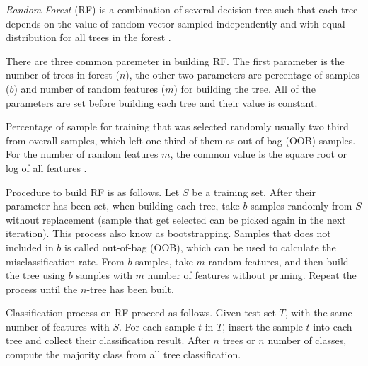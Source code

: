 \textit{Random Forest} (RF)
is a combination of several decision tree such that each tree depends on the
value of random vector sampled independently and with equal distribution for
all trees in the forest
\cite{breiman2001random}.

There are three common paremeter in building RF.
The first parameter is the number of trees in forest ($n$),
the other two parameters are percentage of samples ($b$) and number of random
features ($m$) for building the tree.
All of the parameters are set before building each tree and their value is
constant.

Percentage of sample for training that was selected randomly usually two third
from overall samples, which left one third of them as out of bag (OOB) samples.
For the number of random features $m$, the common value is the square root or
log of all features \cite{breiman2001random}.

Procedure to build RF is as follows.
Let $S$ be a training set.
After their parameter has been set, when building each tree, take $b$ samples
randomly from $S$ without replacement (sample that get selected can be picked
again in the next iteration).
This process also know as bootstrapping.
Samples that does not included in $b$ is called out-of-bag (OOB), which can be
used to calculate the misclassification rate.
From $b$ samples, take $m$ random features, and then build the tree using $b$
samples with $m$ number of features without pruning.
Repeat the process until the $n$-tree has been built.

Classification process on RF proceed as follows.
Given test set $T$, with the same number of features with $S$.
For each sample $t$ in $T$, insert the sample $t$ into each tree and collect
their classification result.
After $n$ trees or $n$ number of classes, compute the majority class from all
tree classification.
